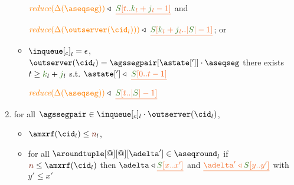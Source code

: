 \begin{definition}
\begin{enumerate}
\begin{itemize}
     
     $\ireduce{\igetdeltas{\aseqseg}}\triangleleft \ \flatten{ \queuemessage[t..\tknown_l+\treceivebuffer_l-1]}$ and 
     
     $\ireduce{\igetdeltas{\outserver(\cid_l) }}\triangleleft \
       \flatten{\queuemessage[\tknown_l+\treceivebuffer_l..|\queuemessage| - 1]}$; or
      
%              
                 

%     
     
       
     \item ${\inclient}_l = \epsilon$,  $\outserver(\cid_l) = \agssegpair[{\astate[']}]\cdot \aseqseg$ there exists $t \geq \tknown_l+\treceivebuffer_l $ s.t.
      $\astate['] \triangleleft \ \flatten{\queuemessage[0 .. t - 1]}$ %
     
       $\ireduce{\igetdeltas{\aseqseg}}\triangleleft \ \flatten{ \queuemessage[t..|\queuemessage| - 1]}$  
     
	
	\end{itemize}	
	
        \item \label{prop_deltas} for all $\agssegpair\in\inclient_l\cdot\outserver(\cid_l)$, 
          \begin{itemize}
          	\item $\amxrf(\cid_l)\leq\irounds_l$,
		\item  for all $\aroundtuple[@][@][\adelta'] \in\pending_l$
        if $\irounds\leq\amxrf(\cid_l)$ then $\adelta\triangleleft \flatten{\queuemessage[x..x']}$ and  $\flatten{\adelta'\triangleleft \queuemessage[y..y']}$
        with $y'\leq x'$
	\end{itemize}

\end{enumerate}
	
\end{definition}


